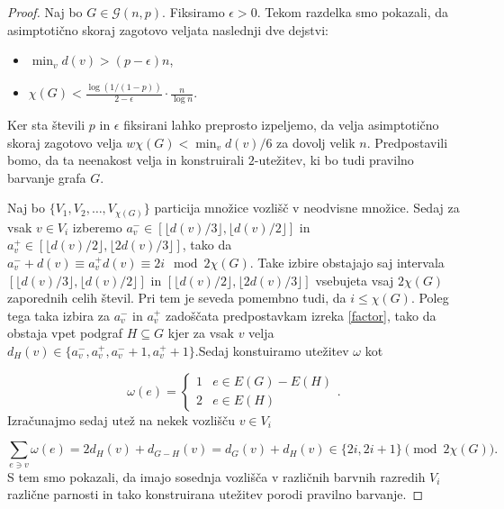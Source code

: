 \documentclass[12pt,a4paper,twoside]{article}
\theoremstyle{definition} %
\theoremstyle{plain} %
\numberwithin{equation}{section}  %
\begin{document}
\begin{proof}
Naj bo $G \in \mathcal{G}(n,p)$. Fiksiramo $\epsilon > 0$. Tekom razdelka smo pokazali, da asimptotično skoraj zagotovo veljata naslednji dve dejstvi:
\begin{itemize}
\item $\min_v d(v) > (p- \epsilon)n$,

\item $\chi(G) < \frac{\log(1/(1-p))}{2 - \epsilon} \cdot \frac{ n}{\log n}.$
\end{itemize}
Ker sta števili $p$ in $\epsilon$ fiksirani lahko preprosto izpeljemo, da velja asimptotično skoraj zagotovo velja $w \chi(G) < \min_vd(v) / 6$ za dovolj velik $n$. Predpostavili bomo, da ta neenakost velja in konstruirali $2$-utežitev, ki bo tudi pravilno barvanje grafa $G$.

Naj bo $\{ V_1, V_2, \ldots, V_{\chi(G)}\}$ particija množice vozlišč v neodvisne množice. Sedaj za vsak $v \in V_i$ izberemo $a_v^- \in [ \lfloor d(v)/3 \rfloor,\lfloor d(v)/2 \rfloor]$ in $a_v^+ \in [ \lfloor d(v)/2 \rfloor,\lfloor 2d(v)/3 \rfloor]$, tako da $a_v^- + d(v) \equiv a_v^+  d(v) \equiv 2i \mod 2\chi(G)$. Take izbire obstajajo saj intervala $ [ \lfloor d(v)/3 \rfloor,\lfloor d(v)/2 \rfloor]$ in $ [ \lfloor d(v)/2 \rfloor,\lfloor 2d(v)/3 \rfloor]$ vsebujeta vsaj $2\chi(G)$ zaporednih celih števil. Pri tem je seveda pomembno tudi, da $i \le \chi(G)$. Poleg tega taka izbira za $a_v^-$ in $a_v^+$ zadoščata predpostavkam izreka \ref{factor}, tako da obstaja vpet podgraf $H \subseteq G$ kjer za vsak $v$ velja $d_H(v) \in \{a_v^-,a_v^+,a_v^- + 1 ,a_v^+ + 1\}$.Sedaj konstuiramo utežitev $\omega$ kot 

$$ \omega(e) = \begin{cases}
	1 & e \in E(G) - E(H)\\ 
	2 & e \in E(H) 
	\end{cases} .$$
Izračunajmo sedaj utež na nekek vozlišču $v \in V_i$

$$ \sum_{e \ni v} \omega(e) = 2 d_H(v) + d_{G-H}(v) = d_{G}(v) + d_H(v) \in \{2i, 2i + 1\} \pmod{2\chi(G)}.$$
S tem smo pokazali, da imajo sosednja vozlišča v različnih barvnih razredih $V_i$ različne parnosti in tako konstruirana utežitev porodi pravilno barvanje.
\end{proof}
\end{document}
